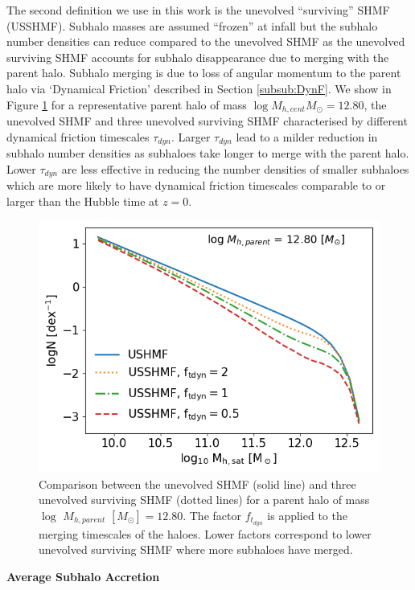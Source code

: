 The second definition we use in this work is the unevolved ``surviving'' SHMF (USSHMF). Subhalo masses are assumed ``frozen'' at infall but the subhalo number densities can reduce compared to the unevolved SHMF as the unevolved surviving SHMF accounts for subhalo disappearance due to merging with the parent halo. Subhalo merging is due to loss of angular momentum to the parent halo via `Dynamical Friction' described in Section \ref{subsub:DynF}. We show in Figure \ref{fig:SHMF_clus} for a representative parent halo of mass $\log M_{h,cent} M_{\odot} = 12.80$, the unevolved SHMF and three unevolved surviving SHMF characterised by different dynamical friction timescales $\tau_{dyn}$. Larger $\tau_{dyn}$ lead to a milder reduction in subhalo number densities as subhaloes take longer to merge with the parent halo. Lower $\tau_{dyn}$ are less effective in reducing the number densities of smaller subhaloes which are more likely to have dynamical friction timescales comparable to or larger than the Hubble time at $z = 0$.
\begin{figure}[h!]
    \centering
    \includegraphics[width = \linewidth]{Figures/Chapter2/SHMF_OneCluster.png}
    \caption{Comparison between the unevolved SHMF (solid line) and three unevolved surviving SHMF  (dotted lines) for a parent halo of mass $\log$ $M_{h,parent}$ $[M_{\odot}] = 12.80$. The factor $f_{t_{dyn}}$ is applied to the merging timescales of the haloes. Lower factors correspond to lower unevolved surviving SHMF where more subhaloes have merged.}
    \label{fig:SHMF_clus}
\end{figure}

\textbf{Average Subhalo Accretion}

